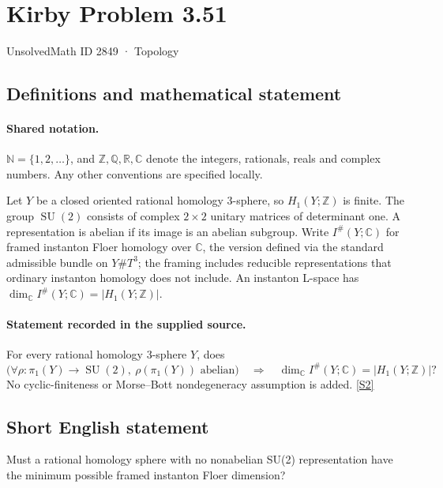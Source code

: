 \documentclass[11pt]{article}
\newcommand{\sref}[2]{\hyperlink{source:#1:#2}{[S#2]}}
\begin{document}
\setcounter{section}{2848}
\section{Kirby Problem 3.51}\label{2849}
{\small\sffamily UnsolvedMath ID 2849 · Topology}
\subsection{Definitions and mathematical statement}

\paragraph{Shared notation.}$\mathbb N=\{1,2,\ldots\}$, and $\mathbb Z,\mathbb Q,\mathbb R,\mathbb C$ denote the integers, rationals, reals and complex numbers. Any other conventions are specified locally.


Let $Y$ be a closed oriented rational homology $3$-sphere, so $H_1(Y;\mathbb Z)$ is finite. The group $\operatorname{SU}(2)$ consists of complex $2\times2$ unitary matrices of determinant one. A representation is abelian if its image is an abelian subgroup. Write $I^\#(Y;\mathbb C)$ for framed instanton Floer homology over $\mathbb C$, the version defined via the standard admissible bundle on $Y\#T^3$; the framing includes reducible representations that ordinary instanton homology does not include. An instanton L-space has $\dim_{\mathbb C}I^\#(Y;\mathbb C)=|H_1(Y;\mathbb Z)|$.
\paragraph{Statement recorded in the supplied source.}
For every rational homology $3$-sphere $Y$, does
\[
\bigl(\forall\rho:\pi_1(Y)\to\operatorname{SU}(2),\ \rho(\pi_1(Y))\text{ abelian}\bigr)
\quad\Longrightarrow\quad
\dim_{\mathbb C}I^\#(Y;\mathbb C)=|H_1(Y;\mathbb Z)|?
\]
No cyclic-finiteness or Morse--Bott nondegeneracy assumption is added. \sref{2849}{2}
\subsection{Short English statement}
Must a rational homology sphere with no nonabelian SU(2) representation have the minimum possible framed instanton Floer dimension?
\end{document}
